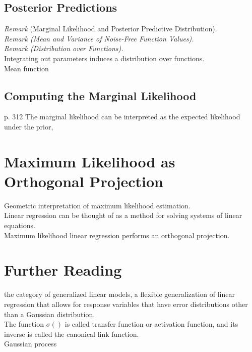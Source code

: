 \subsection{Posterior Predictions}
\textit{Remark} (Marginal Likelihood and Posterior Predictive Distribution). \\
\textit{Remark (Mean and Variance of Noise-Free Function Values).} \\
\textit{Remark (Distribution over Functions).} \\
Integrating out parameters induces a distribution over functions. \\
Mean function \\
\subsection{Computing the Marginal Likelihood}
p. 312
The marginal likelihood can be interpreted as the  expected likelihood under the prior,
\section{Maximum Likelihood as Orthogonal Projection}
Geometric interpretation of maximum likelihood estimation. \\
Linear regression can be thought of as a method for solving systems of linear equations. \\
Maximum likelihood linear regression performs an orthogonal projection. \\
\section{Further Reading}
the category of generalized linear models, a flexible generalization of linear regression that allows for response variables that have error distributions other than a Gaussian distribution. \\
The function $\sigma()$ is called transfer function or activation function, and its inverse is called the canonical link function. \\
Gaussian process \\